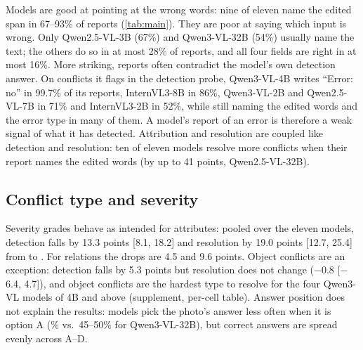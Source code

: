 Models are good at pointing at the wrong words: nine of eleven name the edited span in 67--93\% of reports (\cref{tab:main}). They are poor at saying which input is wrong. Only Qwen2.5-VL-3B (67\%) and Qwen3-VL-32B (54\%) usually name the text; the others do so in at most 28\% of reports, and all four fields are right in at most 16\%. More striking, reports often contradict the model's own detection answer. On conflicts it flags in the detection probe, Qwen3-VL-4B writes ``Error: no'' in 99.7\% of its reports, InternVL3-8B in 86\%, Qwen3-VL-2B and Qwen2.5-VL-7B in 71\% and InternVL3-2B in 52\%, while still naming the edited words and the error type in many of them. A model's report of an error is therefore a weak signal of what it has detected. Attribution and resolution are coupled like detection and resolution: ten of eleven models resolve more conflicts when their report names the edited words (by up to 41 points, Qwen2.5-VL-32B).

\subsection{Conflict type and severity}
\label{sec:severity}

Severity grades behave as intended for attributes: pooled over the eleven models, detection falls by 13.3 points [8.1, 18.2] and resolution by 19.0 points [12.7, 25.4] from \Sone to \Sthree. For relations the drops are 4.5 and 9.6 points. Object conflicts are an exception: detection falls by 5.3 points but resolution does not change ($-$0.8 [$-$6.4, 4.7]), and object conflicts are the hardest type to resolve for the four Qwen3-VL models of 4B and above (supplement, per-cell table). Answer position does not explain the results: models pick the photo's answer less often when it is option A (\% vs.\ 45--50\% for Qwen3-VL-32B), but correct answers are spread evenly across A--D.
